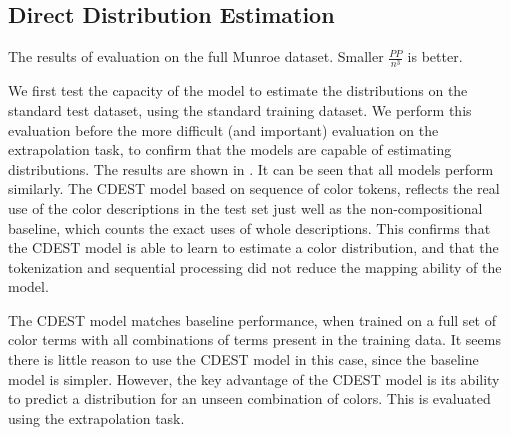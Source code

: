 \documentclass[11pt,a4paper]{article}
\begin{document}
\subsection{Direct Distribution Estimation}

\begin{table}
	\centering
	\caption{\label{tblresfull} The results of evaluation on the full Munroe  dataset. Smaller $\frac{PP}{n^3}$ is better.}
\end{table}

We first test the capacity of the model to estimate the distributions on the standard test dataset, using the standard training dataset.
We perform this evaluation before the more difficult (and important) evaluation on the extrapolation task, to confirm that the models are capable of estimating distributions.
The results are shown in .
It can be seen that all models perform similarly.
The CDEST model based on sequence of color tokens, reflects the real use of the color descriptions in the test set 
just well as the non-compositional baseline, which counts the exact uses of whole descriptions.
This confirms that the CDEST model is able to learn to estimate a color distribution, and that the tokenization and sequential processing did not reduce the mapping ability of the model.

The CDEST model matches baseline performance, when trained on a full set of color terms with all combinations of terms present in the training data.
It seems there is little reason to use the CDEST model in this case, since the baseline model is simpler.
However, the key advantage of the CDEST model is its ability to predict a distribution for an unseen combination of colors. This is evaluated using the extrapolation task.
\end{document}

